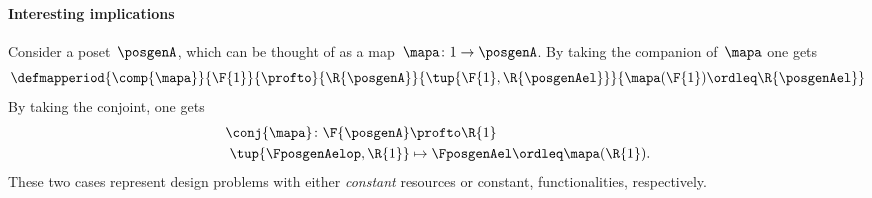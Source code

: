 \paragraph{Interesting implications}
Consider a poset~$\posgenA$, which can be thought of as a map~$\mapa \colon 1\to \posgenA$.
By taking the companion of~$\mapa$ one gets
\begin{equation}
    \defmapperiod{
        \comp{\mapa}
    }{
        \F{1}
    }{
        \profto
    }{
        \R{\posgenA}
    }{
        \tup{\F{1},\R{\posgenAel}}
    }{
        \mapa(\F{1})\ordleq \R{\posgenAel}
    }
\end{equation}
By taking the conjoint, one gets
\begin{equation}
    \begin{aligned}
        \conj{\mapa}\colon \F{\posgenA} & \profto \R{1} \\
        \tup{\FposgenAelop,\R{1}}       & \mapsto \FposgenAel\ordleq \mapa(\R{1}).
    \end{aligned}
\end{equation}
These two cases represent design problems with either \emph{constant} resources or constant, functionalities, respectively.
